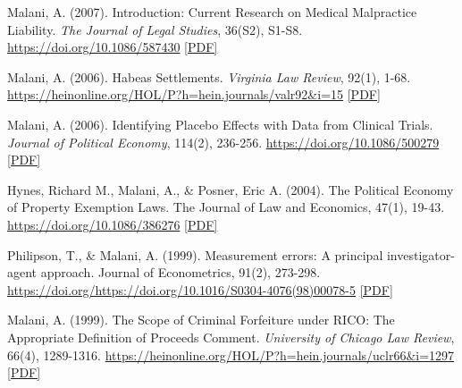 \begin{tablist}
        \item[2007] \tab{}Malani, A. (2007). Introduction: Current Research on Medical Malpractice Liability. \textit{The Journal of Legal Studies}, 36(S2), S1-S8. \href{https://doi.org/10.1086/587430}{https://doi.org/10.1086/587430}  \href{https://github.com/anup-malani/website_personal/blob/main/publications/2007_Malani_MedMalReview.pdf}{[PDF]}
    
        \item[2006] \tab{}Malani, A. (2006). Habeas Settlements. \textit{Virginia Law Review}, 92(1), 1-68. \href{https://heinonline.org/HOL/P?h=hein.journals/valr92&i=15}{https://heinonline.org/HOL/P?h=hein.journals/valr92\&i=15} \href{https://github.com/anup-malani/website_personal/blob/main/publications/2006_Malani_HabeasSettlements.pdf}{[PDF]}

        \item[2006] \tab{}Malani, A. (2006). Identifying Placebo Effects with Data from Clinical Trials. \textit{Journal of Political Economy}, 114(2), 236-256. \href{https://doi.org/10.1086/500279}{https://doi.org/10.1086/500279} \href{https://github.com/anup-malani/website_personal/blob/main/publications/2006_Malani_JPE_PlaceboEffects.pdf}{[PDF]}

        \item[2004] \tab{}Hynes, Richard M., Malani, A., \& Posner, Eric A. (2004). The Political Economy of Property Exemption Laws. The Journal of Law and Economics, 47(1), 19-43. \href{https://doi.org/10.1086/386276}{https://doi.org/10.1086/386276} \href{https://github.com/anup-malani/website_personal/blob/main/publications/2004_HynesMalaniPosner_JLE_PropertyExemptionLaws.pdf}{[PDF]}

        \item[1999] \tab{}Philipson, T., \& Malani, A. (1999). Measurement errors: A principal investigator-agent approach. Journal of Econometrics, 91(2), 273-298. \href{https://doi.org/https://doi.org/10.1016/S0304-4076(98)00078-5}{https://doi.org/https://doi.org/10.1016/S0304-4076(98)00078-5} \href{https://github.com/anup-malani/website_personal/blob/main/publications/1999_PhilipsonMalani_MeasurementErrors.pdf}{[PDF]}

        \item[1999] \tab{}Malani, A. (1999). The Scope of Criminal Forfeiture under RICO: The Appropriate Definition of Proceeds Comment. \textit{University of Chicago Law Review}, 66(4), 1289-1316. \href{https://heinonline.org/HOL/P?h=hein.journals/uclr66&i=1297}{https://heinonline.org/HOL/P?h=hein.journals/uclr66\&i=1297} \href{https://github.com/anup-malani/website_personal/blob/main/publications/1999_Malani_RICOForfeiture.pdf}{[PDF]}


\end{tablist}
